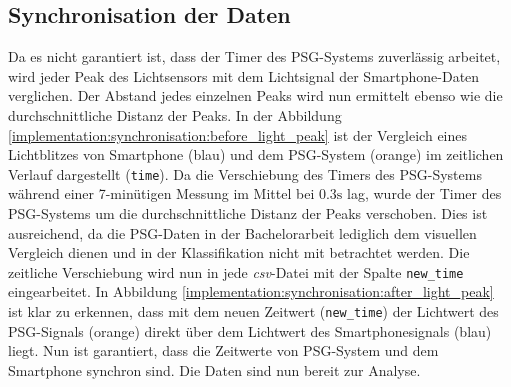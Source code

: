 \subsection{Synchronisation der Daten}
\label{ch:Implementierung:data_sync}
Da es nicht garantiert ist, dass der Timer des PSG-Systems zuverlässig arbeitet, wird jeder Peak des Lichtsensors mit dem Lichtsignal der Smartphone-Daten verglichen.
Der Abstand jedes einzelnen Peaks wird nun ermittelt ebenso wie die durchschnittliche Distanz der Peaks.
In der Abbildung \ref{implementation:synchronisation:before_light_peak} ist der Vergleich eines Lichtblitzes von Smartphone (blau) und dem PSG-System (orange) im zeitlichen Verlauf dargestellt (\texttt{time}).
Da die Verschiebung des Timers des PSG-Systems während einer 7-minütigen Messung im Mittel bei $0.3\si{\s}$ lag, wurde der Timer des PSG-Systems um die durchschnittliche Distanz der Peaks verschoben.
Dies ist ausreichend, da die PSG-Daten in der Bachelorarbeit lediglich dem visuellen Vergleich dienen und in der Klassifikation nicht mit betrachtet werden. 
Die zeitliche Verschiebung wird nun in jede \textit{csv}-Datei mit der Spalte \texttt{new\_time} eingearbeitet.
In Abbildung \ref{implementation:synchronisation:after_light_peak} ist klar zu erkennen, dass mit dem neuen Zeitwert (\texttt{new\_time}) der Lichtwert des PSG-Signals (orange) direkt über dem Lichtwert des Smartphonesignals (blau) liegt.
Nun ist garantiert, dass die Zeitwerte von PSG-System und dem Smartphone synchron sind. Die Daten sind nun bereit zur Analyse.

